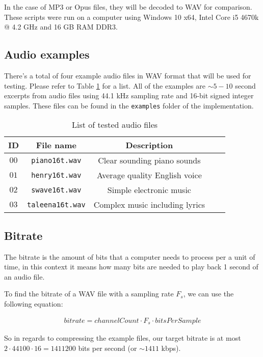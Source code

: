 In the case of MP3 or Opus files, they will be decoded to WAV for comparison. These scripts were run on a computer using Windows 10 x64, Intel Core i5 4670k @ 4.2 GHz and 16 GB RAM DDR3.

\subsection{Audio examples}
There's a total of four example audio files in WAV format that will be used for testing. Please refer to Table \ref{tab:audio_examples} for a list. All of the examples are $\sim5-10$ second excerpts from audio files using 44.1 kHz sampling rate and 16-bit signed integer samples. These files can be found in the \verb|examples| folder of the implementation.

\begin{table}[htbp]\caption{List of tested audio files}
	\label{tab:audio_examples}
	\centering
	\begin{tabular}{|c|c|c|c|l|}
		\hline
		ID & File name & Description \\ \hline
		$00$ & \verb|piano16t.wav| & Clear sounding piano sounds \\
		$01$ & \verb|henry16t.wav| & Average quality English voice \\
		$02$ & \verb|swave16t.wav| & Simple electronic music \\
		$03$ & \verb|taleena16t.wav| & Complex music including lyrics \\
		\hline
	\end{tabular}
\end{table}

\subsection{Bitrate}
The bitrate is the amount of bits that a computer needs to process per a unit of time, in this context it means how many bits are needed to play back 1 second of an audio file.

To find the bitrate of a WAV file with a sampling rate $F_s$, we can use the following equation:

\begin{align}
bitrate = channelCount \cdot F_s \cdot bitsPerSample
\end{align}

So in regards to compressing the example files, our target bitrate is at most $2 \cdot 44100 \cdot 16 = 1411200$ bits per second (or $\sim 1411$ kbps).

